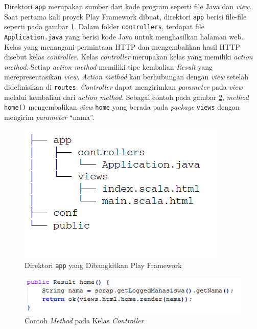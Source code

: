 Direktori \texttt{app} merupakan sumber dari kode program seperti file Java dan \textit{view}. Saat pertama kali proyek Play Framework dibuat, direktori \texttt{app} berisi file-file seperti pada gambar \ref{fig:2_app_dir}. Dalam folder \texttt{controllers}, terdapat file \texttt{Application.java} yang berisi kode Java untuk menghasilkan halaman web. Kelas yang menangani permintaan HTTP dan mengembalikan hasil HTTP disebut kelas \textit{controller}. Kelas \textit{controller} merupakan kelas yang memiliki \textit{action method}. Setiap \textit{action method} memiliki tipe kembalian \textit{Result} yang merepresentasikan \textit{view}. \textit{Action method} kan berhubungan dengan \textit{view} setelah didefinisikan di \texttt{routes}. \textit{Controller} dapat mengirimkan \textit{parameter} pada \textit{view} melalui kembalian dari \textit{action method}. Sebagai contoh pada gambar \ref{fig:2_exam_ctrl}, \textit{method} \texttt{home()} mengembalikan \textit{view} \texttt{home} yang berada pada \textit{package} \texttt{views} dengan mengirim \textit{parameter} ``nama''.

\begin{figure}[H]
	\centering
	\includegraphics[scale=0.5]{Gambar/app-dir}
	\caption{Direktori \texttt{app} yang Dibangkitkan Play Framework\cite{Leroux:2014}} 
	\label{fig:2_app_dir}
\end{figure}

\begin{figure}[H]
	\centering
	\includegraphics[scale=0.75]{Gambar/example-controller}
	\caption{Contoh \textit{Method} pada Kelas \textit{Controller}} 
	\label{fig:2_exam_ctrl}
\end{figure}

